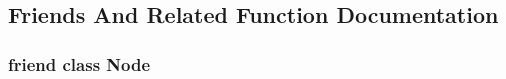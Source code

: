 \subsection{Friends And Related Function Documentation}
\hypertarget{classapollo_1_1cyber_1_1NodeServiceImpl_a6db9d28bd448a131448276ee03de1e6d}{
\subsubsection[{Node}]{\setlength{\rightskip}{0pt plus 5cm}friend class {\bf Node}\hspace{0.3cm}{\ttfamily [friend]}}}\label{classapollo_1_1cyber_1_1NodeServiceImpl_a6db9d28bd448a131448276ee03de1e6d}


